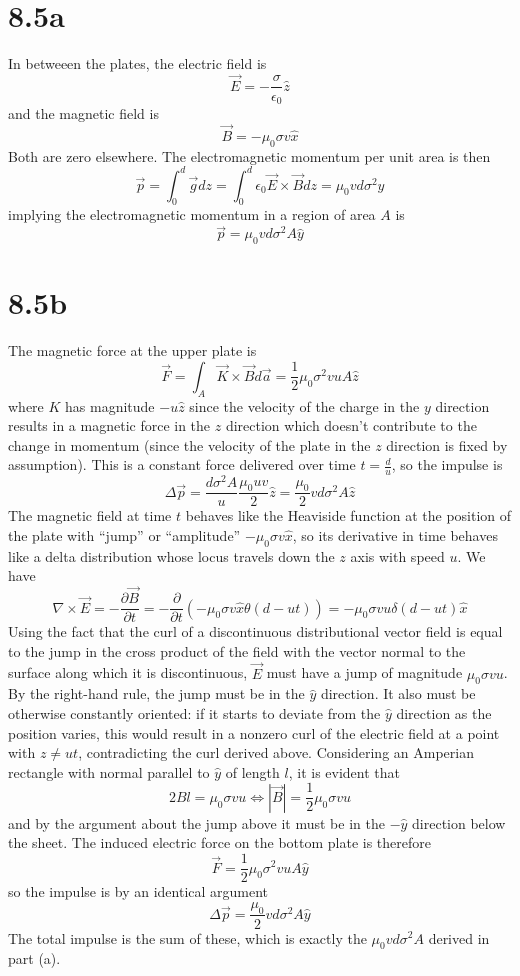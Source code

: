 \documentclass{article}
\begin{document}
\section*{8.5a}
In betweeen the plates, the electric field is
\[\vec{E}=-\frac{\sigma}{\epsilon_{0}}\hat{z}\]
and the magnetic field is
\[\vec{B}=-\mu_{0}\sigma v\hat{x}\]
Both are zero elsewhere.
The electromagnetic momentum per unit area is then
\[\vec{p}=\int_{0}^{d}\vec{g}dz=\int_{0}^{d}\epsilon_{0}\vec{E}\times\vec{B}dz=\mu_{0}vd\sigma^{2}\hat{y}\]
implying the electromagnetic momentum in a region of area $A$ is
\[\vec{p}=\mu_{0}vd\sigma^{2}A\hat{y
  }\]
\section*{8.5b}
The magnetic force at the upper plate is
\[\vec{F}=\int_{A}\vec{K}\times \vec{B}d\vec{a}=\frac{1}{2}\mu_{0}\sigma^{2}vuA\hat{z}\]
where $K$ has magnitude $-u\hat{z}$ since the velocity of the charge in the $y$ direction results in a magnetic force in the $z$ direction which doesn't contribute to the change in momentum (since the velocity of the plate in the $z$ direction is fixed by assumption).
This is a constant force delivered over time $t=\frac{d}{u}$, so the impulse is
\[\Delta \vec{p}=\frac{d\sigma^{2}A}{u} \frac{\mu_{0}uv}{2}\hat{z}=\frac{\mu_{0}}{2}vd\sigma^{2}A\hat{z}\]
The magnetic field at time $t$ behaves like the Heaviside function at the position of the plate with ``jump'' or ``amplitude'' $-\mu_{0}\sigma v\hat{x}$, so its derivative in time behaves like a delta distribution whose locus travels down the $z$ axis with speed $u$. We have
\[\nabla \times \vec{E}=-\frac{\partial \vec{B}}{\partial t}=-\frac{\partial }{\partial t}\left( -\mu_{0}\sigma v \hat{x}\theta(d-ut) \right)=-\mu_{0}\sigma v u\delta(d-ut)\hat{x}\]
Using the fact that the curl of a discontinuous distributional vector field is equal to the jump in the cross product of the field with the vector normal to the surface along which it is discontinuous, $\vec{E}$ must have a jump of magnitude $\mu_{0}\sigma vu$. By the right-hand rule, the jump must be in the $\hat{y}$ direction. It also must be otherwise constantly oriented: if it starts to deviate from the $\hat{y}$ direction as the position varies, this would result in a nonzero curl of the electric field at a point with $z\neq ut$, contradicting the curl derived above. Considering an Amperian rectangle with normal parallel to $\hat{y}$ of length $l$, it is evident that
\[2Bl=\mu_{0}\sigma vu\Leftrightarrow |\vec{B}|=\frac{1}{2}\mu_{0}\sigma vu\]
and by the argument about the jump above it must be in the $-\hat{y}$ direction below the sheet.
The induced electric force on the bottom plate is therefore
\[\vec{F}=\frac{1}{2}\mu_{0}\sigma^{2} vuA\hat{y}\]
so the impulse is by an identical argument
\[\Delta \vec{p}=\frac{\mu_{0}}{2}vd\sigma^{2}A\hat{y}\]
The total impulse is the sum of these, which is exactly the $\mu_{0}vd\sigma^{2}A$ derived in part (a).
\end{document}
